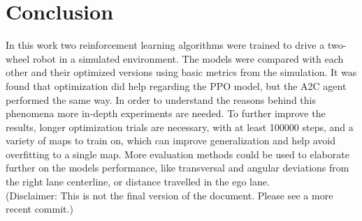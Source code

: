 \documentclass{article}
\begin{document}
\section{\large{Conclusion}}
In this work two reinforcement learning algorithms were trained to drive a two-wheel robot in a simulated environment. 
The models were compared with each other and their optimized versions using basic metrics from the simulation. 
It was found that optimization did help regarding the PPO model, but the A2C agent performed the same way. In order to understand the reasons behind this phenomena more in-depth experiments are needed. 
To further improve the results, longer optimization trials are necessary, with at least 100000 steps, and a variety of maps to train on, which can improve generalization and help avoid overfitting to a single map.
More evaluation methods could be used to elaborate further on the models performance, like transversal and angular deviations from the right lane centerline, or distance travelled in the ego lane.\\

(Disclaimer: This is not the final version of the document. Please see a more recent commit.)


%

%
\end{document}

